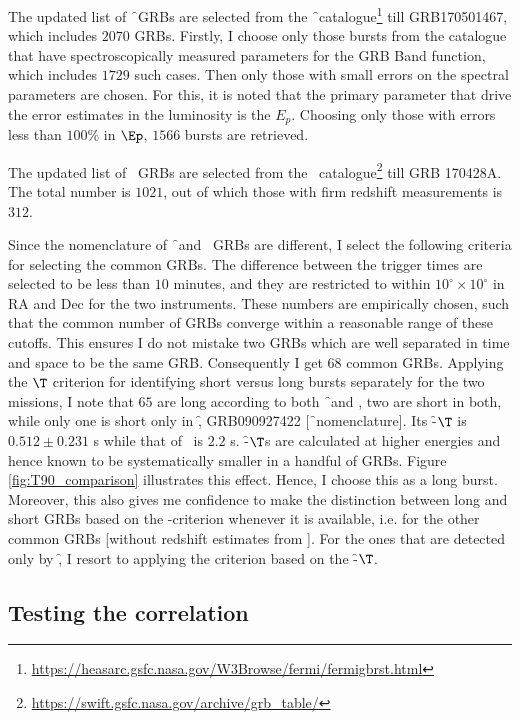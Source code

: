 The updated list of \f\ GRBs are selected from the \f\ catalogue\footnote{\url{https://heasarc.gsfc.nasa.gov/W3Browse/fermi/fermigbrst.html}} till GRB170501467, which includes $2070$ GRBs. Firstly, I choose only those bursts from the catalogue that have spectroscopically measured parameters for the GRB Band function, which includes $1729$ such cases. Then only those with small errors on the spectral parameters are chosen. For this, it is noted that the primary parameter that drive the error estimates in the luminosity is the $E_p$. Choosing only those with errors less than $100\%$ in $\Ep$, $1566$ bursts are retrieved.

The updated list of \s\ GRBs are selected from the \s\ catalogue\footnote{\url{https://swift.gsfc.nasa.gov/archive/grb_table/}} till GRB 170428A. The total number is $1021$, out of which those with firm redshift measurements is $312$.

Since the nomenclature of \f\ and \s\ GRBs are different, I select the following criteria for selecting the common GRBs. The difference between the trigger times are selected to be less than $10$ minutes, and they are restricted to within $10^{\circ} \times 10^{\circ}$ in RA and Dec for the two instruments. These numbers are empirically chosen, such that the common number of GRBs converge within a reasonable range of these cutoffs. This ensures I do not mistake two GRBs which are well separated in time and space to be the same GRB. Consequently I get $68$ common GRBs. Applying the $\T$ criterion for identifying short versus long bursts  separately for the two missions, I note that $65$ are long according to both \f\ and \s, two are short in both, while only one is short only in \f, GRB090927422 [\f\ nomenclature]. Its \f-$\T$ is $0.512 \pm 0.231$ s while that of \s\ is $2.2$ s. \f-$\T$s are calculated at higher energies and hence known to be systematically smaller in a handful of GRBs. Figure \ref{fig:T90_comparison} illustrates this effect. Hence, I choose this as a long burst. Moreover, this also gives me confidence to make the distinction between long and short GRBs based on the \s-criterion whenever it is available, i.e. for the other common GRBs [without redshift estimates from \s]. For the ones that are detected only by \f, I resort to applying the criterion based on the \f-$\T$.


\subsection{Testing the correlation}

